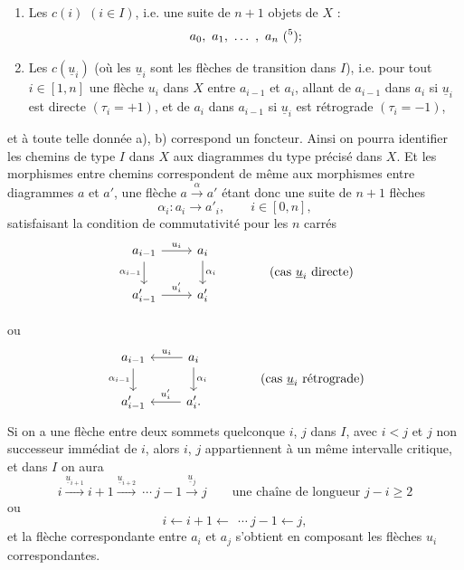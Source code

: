 \documentclass[11pt]{article}
\newcommand{\printedpage}[1]{\marginpar{\footnotesize p.~#1}}
\newcommand{\msp}[1]{\marginpar{\footnotesize [#1]}}
\begin{document}
\begin{enumerate}
\item[a)] Les $c(i)$ $(i \in I)$, i.e. une suite de $n+1$ objets de $X$ :
\[
a_0,\ a_1,\ \dots\ ,\ a_n\ (\text{\footnotemark[5]});
\]

\item[b)] Les $c(\underline{u}_i)$ (où les $\underline{u}_i$ sont les flèches de transition dans $I$), i.e. pour tout $i \in [1,n]$ une flèche $u_i$ dans $X$ entre $a_{i-1}$ et $a_i$, allant de $a_{i-1}$ dans $a_i$ si $\underline{u}_i$ est directe $(\tau_i = +1)$, et de $a_i$ dans $a_{i-1}$ si $\underline{u}_i$ est rétrograde $(\tau_i = -1)$,
\end{enumerate}

et à toute telle donnée a), b) correspond un foncteur. Ainsi on pourra identifier les chemins de type $I$ \msp{page 14} dans $X$ aux diagrammes du type précisé dans $X$. Et les morphismes entre chemins correspondent de même aux morphismes entre diagrammes $a$ et $a'$, une flèche $a \xrightarrow{\alpha} a'$ étant donc une suite de $n+1$ flèches
\[
\alpha_i : a_i \longrightarrow a'_i, \qquad i \in [0,n],
\]
satisfaisant la condition de commutativité pour les $n$ carrés
\[
\begin{tikzcd}
a_{i-1} \arrow[r, "u_i"] \arrow[d, "\alpha_{i-1}"'] & a_i \arrow[d, "\alpha_i"] \\
a'_{i-1} \arrow[r, "u'_i"] & a'_i
\end{tikzcd}
\qquad\qquad \text{(cas $\underline{u}_i$ directe)}
\]

\printedpage{10}
ou
\[
\begin{tikzcd}
a_{i-1} \arrow[d, "\alpha_{i-1}"'] & a_i \arrow[l, "u_i"'] \arrow[d, "\alpha_i"] \\
a'_{i-1} & a'_i. \arrow[l, "u'_i"']
\end{tikzcd}
\qquad\qquad \text{(cas $\underline{u}_i$ rétrograde)}
\]
Si on a une flèche entre deux sommets quelconque $i$, $j$ dans $I$, avec $i < j$ et $j$ non successeur immédiat de $i$, alors $i$, $j$ appartiennent à un même intervalle critique, et dans $I$ on aura %
\[
i \xrightarrow{\underline{u}_{i+1}} i+1 \xrightarrow{\underline{u}_{i+2}}\ \cdots\ j-1 \xrightarrow{\underline{u}_j} j \qquad \text{une chaîne de longueur } j-i \geq 2 %
\]
ou
\[
i \longleftarrow i+1 \longleftarrow\ \ \cdots\ j-1 \longleftarrow j,
\]
et la flèche correspondante entre $a_i$ et $a_j$ s'obtient en composant les flèches $u_i$ correspondantes.
\end{document}
